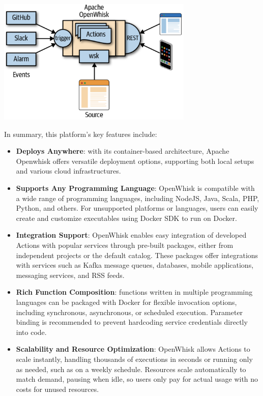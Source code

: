 \begin{center}
    \includegraphics[width=0.7\textwidth]{img/ow_works.png}
    \vspace{10pt}
\end{center}
In summary, this platform’s key features include\cite{huy2021crypto}:
\begin{itemize}
    \item \textbf{Deploys Anywhere}: with its container-based architecture, Apache Openwhisk offers versatile deployment options, supporting both local setups and various cloud infrastructures.
    \item \textbf{Supports Any Programming Language}: OpenWhisk is compatible with a wide range of programming languages, including NodeJS, Java, Scala, PHP, Python, and others. For unsupported platforms or languages, users can easily create and customize executables using Docker SDK to run on Docker.
    \item \textbf{Integration Support}: OpenWhisk enables easy integration of developed Actions with popular services through pre-built packages, either from independent projects or the default catalog. These packages offer integrations with services such as Kafka message queues, databases, mobile applications, messaging services, and RSS feeds.
    \item \textbf{Rich Function Composition}: functions written in multiple programming languages can be packaged with Docker for flexible invocation options, including synchronous, asynchronous, or scheduled execution. Parameter binding is recommended to prevent hardcoding service credentials directly into code.
    \item \textbf{Scalability and Resource Optimization}: OpenWhisk allows Actions to scale instantly, handling thousands of executions in seconds or running only as needed, such as on a weekly schedule. Resources scale automatically to match demand, pausing when idle, so users only pay for actual usage with no costs for unused resources.
\end{itemize}